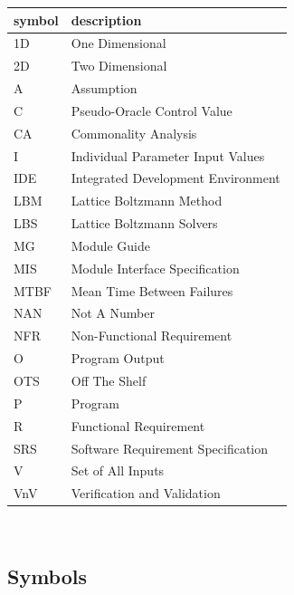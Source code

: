 \documentclass[12pt, titlepage]{article}
\begin{document}
\renewcommand{\arraystretch}{1.2}
\begin{tabular}{l l} 
  \toprule		
  \textbf{symbol} & \textbf{description}\\
  \midrule 
  1D & One Dimensional\\
  2D & Two Dimensional\\
  A & Assumption\\
  C & Pseudo-Oracle Control Value\\
  CA & Commonality Analysis\\
  I & Individual Parameter Input Values\\
  IDE & Integrated Development Environment\\
  LBM & Lattice Boltzmann Method\\
  LBS & Lattice Boltzmann Solvers\\
  MG & Module Guide\\
  MIS & Module Interface Specification\\
  MTBF & Mean Time Between Failures\\
  NAN & Not A Number\\
  NFR & Non-Functional Requirement\\
  O & Program Output\\
  OTS & Off The Shelf\\
  P & Program\\
  R & Functional Requirement\\
  SRS & Software Requirement Specification\\
  V & Set of All Inputs\\
  VnV & Verification and Validation\\
  \bottomrule
\end{tabular}\\

\newpage

\subsection{Symbols}
\end{document}
